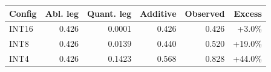 \setlength{\tabcolsep}{3.5pt}
\begin{tabular}{lrrrrr}
\toprule
Config & Abl. leg & Quant. leg & Additive & Observed & Excess \\
\midrule
INT16 & 0.426 & 0.0001 & 0.426 & 0.426 & +3.0\% \\
INT8 & 0.426 & 0.0139 & 0.440 & 0.520 & +19.0\% \\
INT4 & 0.426 & 0.1423 & 0.568 & 0.828 & +44.0\% \\
\bottomrule
\end{tabular}

